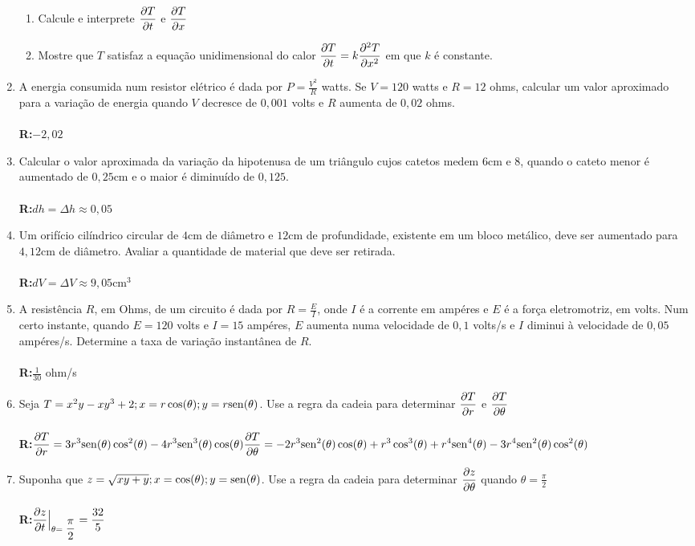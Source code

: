 \documentclass[oneside,a4paper,12pt]{article}
\newcommand{\sen}{{\rm sen}}
\newcommand{\R}{\\{\bf R:}}
\begin{document}
\begin{enumerate}
        \begin{enumerate}
            \item Calcule e interprete $\displaystyle \pdv{T}{t}$ e $\displaystyle \pdv{T}{x}$
            \item Mostre que $T$ satisfaz a equação unidimensional do calor $\displaystyle \pdv{T}{t} = k \displaystyle \pdv[2]{T}{x}$ em que $k$ é constante.
        \end{enumerate}
    \item A energia consumida num resistor elétrico é dada por $\displaystyle P = \frac{V^2}{R}$ watts. Se $V=120$ watts e $R = 12$ ohms, calcular um valor aproximado para a variação de energia quando $V$ decresce de $0,001$ volts e $R$ aumenta de $0,02$ ohms. \\\R $-2,02$
    \item Calcular o valor aproximada da variação da hipotenusa de um triângulo cujos catetos medem $6$cm e $8$, quando o cateto menor é aumentado de $0,25$cm e o maior é diminuído de $0,125$. \\\R $dh=\Delta h \approx 0,05$
    \item Um orifício cilíndrico circular de $4$cm de diâmetro e $12$cm de profundidade, existente em um bloco metálico, deve ser aumentado para $4,12$cm de diâmetro. Avaliar a quantidade de material que deve ser retirada. \\\R $dV = \Delta V \approx 9,05$cm$^3$
    \item A resistência $R$, em Ohms, de um circuito é dada por $\displaystyle R = \frac{E}{I}$, onde $I$ é a corrente em ampéres e $E$ é a força eletromotriz, em volts. Num certo instante, quando $E=120$ volts e $I=15$ ampéres, $E$ aumenta numa velocidade de $0,1$ volts/s e $I$ diminui à velocidade de $0,05$ ampéres/s. Determine a taxa de variação instantânea de $R$. \\\R $\displaystyle \frac{1}{30}$ ohm/s
    \item Seja $T=x^2y-xy^3+2;x=r\cos(\theta); y = r\sen(\theta)$. Use a regra da cadeia para determinar $\displaystyle \pdv{T}{r}$ e $\displaystyle \pdv{T}{\theta}$ \\\R $\displaystyle \pdv{T}{r}=3r^3\sen(\theta)\cos^2(\theta)-4r^3\sen^3(\theta)\cos(\theta)\\ \displaystyle \pdv{T}{\theta}= -2r^3\sen^2(\theta)\cos(\theta)+r^3\cos^3(\theta)+r^4\sen^4(\theta)-3r^4\sen^2(\theta)\cos^2(\theta)$
    \item Suponha que $z=\sqrt{xy+y};x=\cos(\theta);y=\sen(\theta)$. Use a regra da cadeia para determinar $\displaystyle \pdv{z}{\theta}$ quando $\theta = \displaystyle\frac{\pi}{2}$\\\R $\displaystyle \pdv{z}{t}\Big|_{\theta = \displaystyle \frac{\pi}{2}} = \frac{32}{5}$
    

\end{enumerate}
\end{document}

